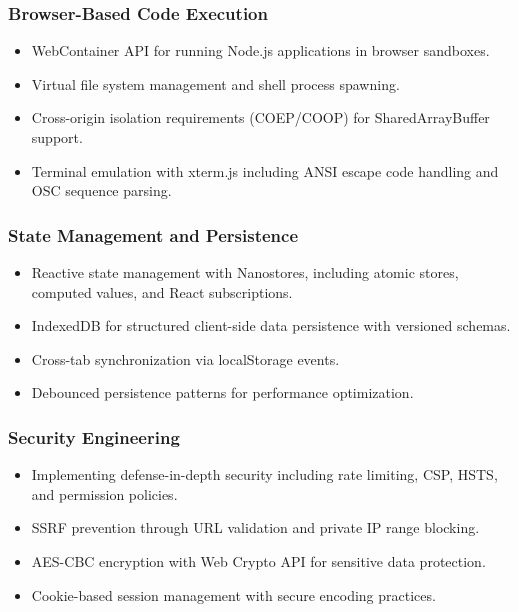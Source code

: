 \documentclass[12pt,a4paper,openany]{report}
\begin{document}
\subsubsection{Browser-Based Code Execution}
\begin{itemize}
    \item WebContainer API for running Node.js applications in browser sandboxes.
    \item Virtual file system management and shell process spawning.
    \item Cross-origin isolation requirements (COEP/COOP) for SharedArrayBuffer support.
    \item Terminal emulation with xterm.js including ANSI escape code handling and OSC sequence parsing.
\end{itemize}

\subsubsection{State Management and Persistence}
\begin{itemize}
    \item Reactive state management with Nanostores, including atomic stores, computed values, and React subscriptions.
    \item IndexedDB for structured client-side data persistence with versioned schemas.
    \item Cross-tab synchronization via localStorage events.
    \item Debounced persistence patterns for performance optimization.
\end{itemize}

\subsubsection{Security Engineering}
\begin{itemize}
    \item Implementing defense-in-depth security including rate limiting, CSP, HSTS, and permission policies.
    \item SSRF prevention through URL validation and private IP range blocking.
    \item AES-CBC encryption with Web Crypto API for sensitive data protection.
    \item Cookie-based session management with secure encoding practices.
\end{itemize}
\end{document}

